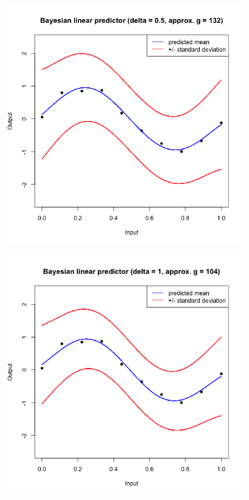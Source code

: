 \documentclass[a4paper, 11pt]{article}
\begin{document}
\begin{figure}[H]
\centering
\begin{subfigure}{.5\textwidth}
  \centering
  \includegraphics[width=1\linewidth]{ps3F_plot3.png}
\end{subfigure}%
\begin{subfigure}{.5\textwidth}
  \centering
  \includegraphics[width=1\linewidth]{ps3F_plot4.png}
\end{subfigure}
\end{figure}
\end{document}
